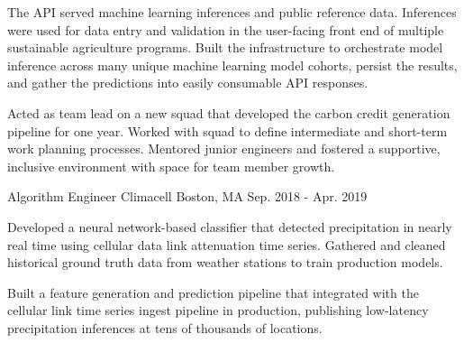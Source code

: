 \begin{cventries}
{\begin{cvitems}
{            The API served machine learning inferences and public reference data. Inferences were used for data entry
            and validation in the user-facing front end of multiple sustainable agriculture programs.
            Built the infrastructure to orchestrate model inference across many unique machine learning model cohorts,
            persist the results, and gather the predictions into easily consumable API responses.
        }
        \item {
            Acted as team lead on a new squad that developed the carbon credit generation pipeline
            for one year. Worked with squad to define intermediate and short-term work planning processes.
            Mentored junior engineers and fostered a supportive, inclusive environment with space for
            team member growth.
        }
      \end{cvitems}
    }

  \cventry
    {Algorithm Engineer} %
    {Climacell} %
    {Boston, MA} %
    {Sep. 2018 - Apr. 2019} %
    {
      \begin{cvitems} %
        \item {
            Developed a neural network-based classifier that detected
            precipitation in nearly real time using cellular data link attenuation
            time series. Gathered and cleaned historical ground truth 
            data from weather stations to train production models.
        }
        \item {
            Built a feature generation and prediction pipeline that integrated
            with the cellular link time series ingest pipeline in production,
            publishing low-latency precipitation inferences at tens of thousands
            of locations.
        }
      \end{cvitems}
    }


\end{cventries}
